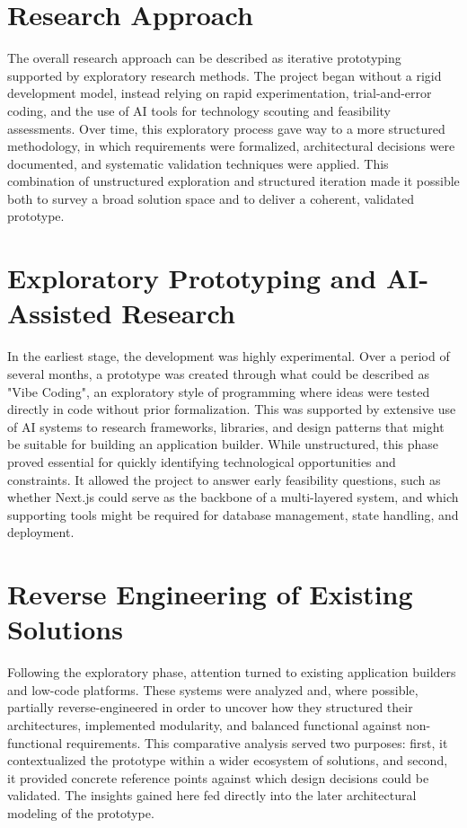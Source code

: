 \documentclass[oneside,12pt]{book}
\begin{document}
\section{Research Approach}

The overall research approach can be described as iterative prototyping supported by exploratory research methods. The project began without a rigid development model, instead relying on rapid experimentation, trial-and-error coding, and the use of AI tools for technology scouting and feasibility assessments. Over time, this exploratory process gave way to a more structured methodology, in which requirements were formalized, architectural decisions were documented, and systematic validation techniques were applied. This combination of unstructured exploration and structured iteration made it possible both to survey a broad solution space and to deliver a coherent, validated prototype.

\section{Exploratory Prototyping and AI-Assisted Research}

In the earliest stage, the development was highly experimental. Over a period of several months, a prototype was created through what could be described as "\gls{Vibe Coding}", an exploratory style of programming where ideas were tested directly in code without prior formalization. This was supported by extensive use of AI systems to research frameworks, libraries, and design patterns that might be suitable for building an application builder. While unstructured, this phase proved essential for quickly identifying technological opportunities and constraints. It allowed the project to answer early feasibility questions, such as whether Next.js could serve as the backbone of a multi-layered system, and which supporting tools might be required for database management, state handling, and deployment.

\section{Reverse Engineering of Existing Solutions}

Following the exploratory phase, attention turned to existing application builders and low-code platforms. These systems were analyzed and, where possible, partially reverse-engineered in order to uncover how they structured their architectures, implemented modularity, and balanced functional against non-functional requirements. This comparative analysis served two purposes: first, it contextualized the prototype within a wider ecosystem of solutions, and second, it provided concrete reference points against which design decisions could be validated. The insights gained here fed directly into the later architectural modeling of the prototype.
\end{document}
